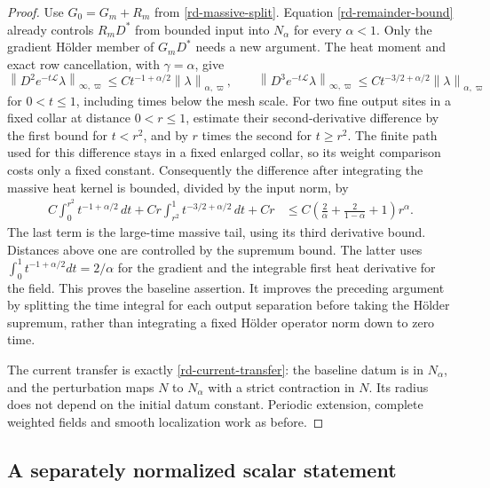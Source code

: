 \documentclass[11pt]{article}
\theoremstyle{remark}
\newcommand{\norm}[1]{\left\|#1\right\|}
\begin{document}
\begin{proof}
Use $G_0=G_m+R_m$ from \eqref{rd-massive-split}.
Equation \eqref{rd-remainder-bound} already controls $R_mD^*$
from bounded input into $N_\alpha$ for every $\alpha<1$.
Only the gradient H\"older member of $G_mD^*$ needs a new
argument. The heat moment and exact row cancellation, with
$\gamma=\alpha$, give
\[
 \norm{D^2e^{-t\mathcal L}\lambda}_{\infty,\varpi}
       \le Ct^{-1+\alpha/2}\norm{\lambda}_{\alpha,\varpi},
 \qquad
 \norm{D^3e^{-t\mathcal L}\lambda}_{\infty,\varpi}
       \le Ct^{-3/2+\alpha/2}\norm{\lambda}_{\alpha,\varpi}
\]
for $0<t\le1$, including times below the mesh scale.
For two fine output sites in a fixed collar at distance
$0<r\le1$, estimate their second-derivative difference by the
first bound for $t<r^2$, and by $r$ times the second for $t\ge r^2$.
The finite path used for this difference stays in a fixed enlarged
collar, so its weight comparison costs only a fixed constant.
Consequently the difference after integrating the massive heat
kernel is bounded, divided by the input norm, by
\begin{align}
 C\int_0^{r^2}t^{-1+\alpha/2}\,dt
 +Cr\int_{r^2}^1t^{-3/2+\alpha/2}\,dt+Cr
 &\le C\left(\frac2\alpha+
                     \frac2{1-\alpha}+1\right)r^\alpha.
 \label{ss-split-integral}
\end{align}
The last term is the large-time massive tail, using its third
derivative bound. Distances above one are controlled by the
supremum bound. The latter uses
$\int_0^1t^{-1+\alpha/2}dt=2/\alpha$ for the gradient and the
integrable first heat derivative for the field. This proves the
baseline assertion. It improves the preceding argument by
splitting the time integral for each output separation before
taking the H\"older supremum, rather than integrating a fixed
H\"older operator norm down to zero time.

The current transfer is exactly \eqref{rd-current-transfer}:
the baseline datum is in $N_\alpha$, and the perturbation maps
$N$ to $N_\alpha$ with a strict contraction in $N$. Its radius
does not depend on the initial datum constant. Periodic extension,
complete weighted fields and smooth localization work as before.
\end{proof}

\subsection{A separately normalized scalar statement}
\end{document}
